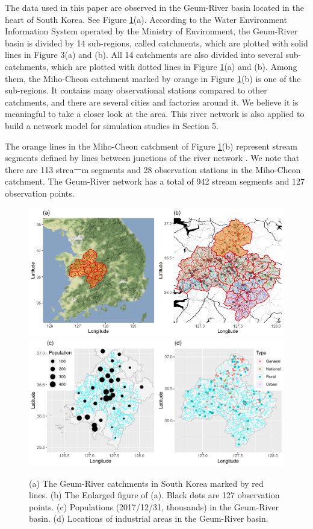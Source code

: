 \documentclass[11pt,titlepage]{article}
\begin{document}
The data used in this paper are observed in the Geum-River basin located in the heart of South Korea. See Figure \ref{fig:studyarea}(a). According to the Water Environment Information System operated by the Ministry of Environment, the Geum-River basin is divided by 14 sub-regions, called catchments, which are plotted with solid lines in Figure 3(a) and (b). All 14 catchments are also divided into several sub-catchments, which are plotted with dotted lines in Figure \ref{fig:studyarea}(a) and (b). Among them, the Miho-Cheon catchment marked by orange in Figure \ref{fig:studyarea}(b) is one of the sub-regions. It contains many observational stations compared to other catchments, and there are several cities and factories around it. We believe it is meaningful to take a closer look at the area. This river network is also applied to build a network model for simulation studies in Section 5. 

The orange lines in the Miho-Cheon catchment of Figure \ref{fig:studyarea}(b) represent stream segments defined by lines between junctions of the river network \citep{VerHoef(2006), VerHoef(2010)}. We note that there are 113 streaㅡm segments and 28 observation stations in the Miho-Cheon catchment. The Geum-River network has a total of 942 stream segments and 127 observation points. 

\begin{figure}[!th]
	\centering\includegraphics[width=\textwidth]{Stream_result/Studyarea_small.png}
	\includegraphics[width=\textwidth]{Stream_result/Studyarea_additional.pdf}\caption{(a) The Geum-River catchments in South Korea marked by red lines. (b) The Enlarged figure of (a). Black dots are 127 observation points. (c) Populations (2017/12/31, thousands) in the Geum-River basin. (d) Locations of industrial areas in the Geum-River basin.}
	\label{fig:studyarea}
\end{figure}
\end{document}
